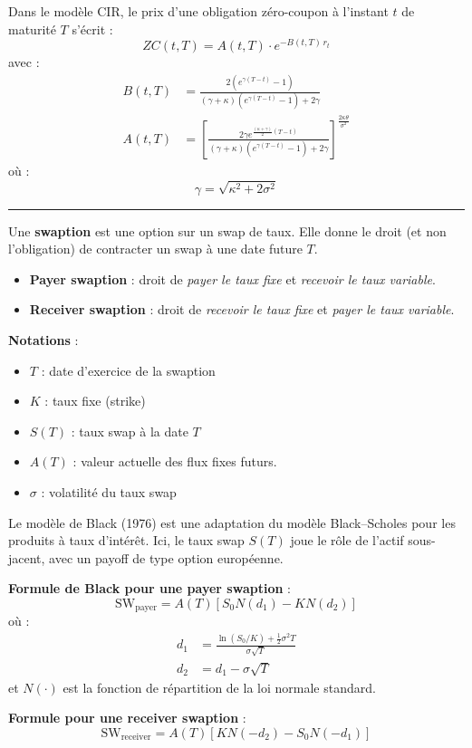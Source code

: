 \begin{f}
Dans le modèle CIR, le prix d’une obligation zéro-coupon à l’instant \(t\) de maturité \(T\) s’écrit :
\[
ZC(t, T) = A(t, T) \cdot e^{-B(t, T)\, r_t}
\]
avec :
\[
\begin{aligned}
	B(t, T) &= \frac{2 (e^{\gamma (T - t)} - 1)}{(\gamma + \kappa)(e^{\gamma (T - t)} - 1) + 2\gamma} \\
	A(t, T) &= \left[ \frac{2\gamma e^{\frac{(\kappa + \gamma)}{2}(T - t)}}{(\gamma + \kappa)(e^{\gamma (T - t)} - 1) + 2\gamma} \right]^{\frac{2\kappa\theta}{\sigma^2}}
\end{aligned}
\]
où :
\[
\gamma = \sqrt{\kappa^2 + 2\sigma^2}
\]

\end{f}
\hrule

\begin{f}

Une \textbf{swaption} est une option sur un swap de taux. Elle donne le droit (et non l'obligation) de contracter un swap à une date future \(T\).

\begin{itemize}[nosep]
	\item \textbf{Payer swaption} : droit de \emph{payer le taux fixe} et \emph{recevoir le taux variable}.
	\item \textbf{Receiver swaption} : droit de \emph{recevoir le taux fixe} et \emph{payer le taux variable}.
\end{itemize}

\textbf{Notations} :
\begin{itemize}[nosep]
	\item \(T\) : date d’exercice de la swaption
	\item \(K\) : taux fixe (strike)
	\item \(S(T)\) : taux swap à la date \(T\)
	\item \(A(T)\) : valeur actuelle des flux fixes futurs.
	\item \(\sigma\) : volatilité du taux swap
\end{itemize}

Le modèle de Black (1976) est une adaptation du modèle Black–Scholes pour les produits à taux d'intérêt. Ici, le taux swap \(S(T)\) joue le rôle de l’actif sous-jacent, avec un payoff de type option européenne.

\textbf{Formule de Black pour une payer swaption} :
\[
\text{SW}_{\text{payer}} = A(T) \left[ S_0 N(d_1) - K N(d_2) \right]
\]
où :
\[
\begin{aligned}
	d_1 &= \frac{\ln(S_0 / K) + \frac{1}{2} \sigma^2 T}{\sigma \sqrt{T}} \\
	d_2 &= d_1 - \sigma \sqrt{T}
\end{aligned}
\]
et \(N(\cdot)\) est la fonction de répartition de la loi normale standard.

\textbf{Formule pour une receiver swaption} :
\[
\text{SW}_{\text{receiver}} = A(T) \left[ K N(-d_2) - S_0 N(-d_1) \right]
\]

\end{f}

